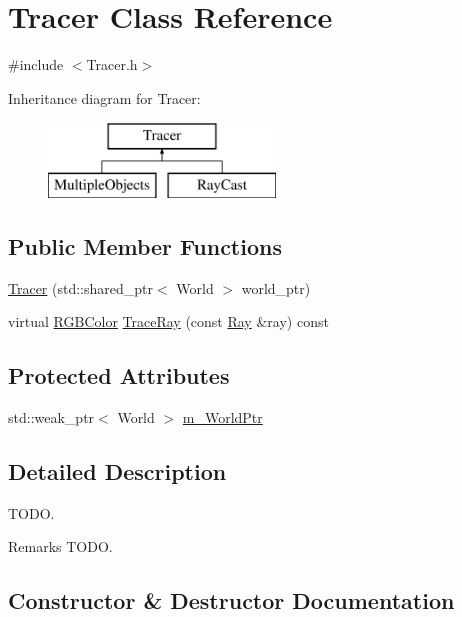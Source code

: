 \hypertarget{class_tracer}{}\section{Tracer Class Reference}
\label{class_tracer}


{\ttfamily \#include $<$Tracer.\+h$>$}

Inheritance diagram for Tracer\+:\begin{figure}[H]
\begin{center}
\leavevmode
\includegraphics[height=2.000000cm]{class_tracer}
\end{center}
\end{figure}
\subsection*{Public Member Functions}
\begin{DoxyCompactItemize}
\item 
\hyperlink{class_tracer_a0db4955b57c72acfcbb4144f539c5744}{Tracer} (std\+::shared\+\_\+ptr$<$ World $>$ world\+\_\+ptr)
\item 
virtual \hyperlink{class_r_g_b_color}{R\+G\+B\+Color} \hyperlink{class_tracer_adbabdfde11e278945a0433d08445fcce}{Trace\+Ray} (const \hyperlink{class_ray}{Ray} \&ray) const
\end{DoxyCompactItemize}
\subsection*{Protected Attributes}
\begin{DoxyCompactItemize}
\item 
std\+::weak\+\_\+ptr$<$ World $>$ \hyperlink{class_tracer_a0fc389376b5ab36e08fd8e1f6ea16450}{m\+\_\+\+World\+Ptr}
\end{DoxyCompactItemize}


\subsection{Detailed Description}
T\+O\+DO. \begin{DoxyRemark}{Remarks}
T\+O\+DO. 
\end{DoxyRemark}


\subsection{Constructor \& Destructor Documentation}
\hypertarget{class_tracer_a0db4955b57c72acfcbb4144f539c5744}{}\label{class_tracer_a0db4955b57c72acfcbb4144f539c5744} 
